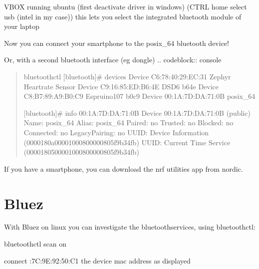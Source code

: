 \documentclass[letterpaper,10pt,english]{sphinxmanual}
\begin{document}
VBOX running ubuntu (first deactivate driver in windows)
(CTRL home \textendash{} select usb \textendash{} (intel in my case)) \textendash{} this lets you select the integrated bluetooth module of your laptop

\begin{sphinxVerbatim}[commandchars=\\\{\}]
  

     
 
\end{sphinxVerbatim}

Now you can connect your smartphone to the posix\_64 bluetooth device!

Or, with a second bluetooth interface (eg dongle)
.. code\sphinxhyphen{}block:: console
\begin{quote}

bluetoothctl
{[}bluetooth{]}\# devices
Device C6:78:40:29:EC:31 Zephyr Heartrate Sensor
Device C9:16:85:ED:B6:4E DS\sphinxhyphen{}D6 b64e
Device C8:B7:89:A9:B0:C9 Espruino\sphinxhyphen{}107 b0c9
Device 00:1A:7D:DA:71:0B posix\_64

{[}bluetooth{]}\# info 00:1A:7D:DA:71:0B
Device 00:1A:7D:DA:71:0B (public)
Name: posix\_64
Alias: posix\_64
Paired: no
Trusted: no
Blocked: no
Connected: no
LegacyPairing: no
UUID: Device Information        (0000180a\sphinxhyphen{}0000\sphinxhyphen{}1000\sphinxhyphen{}8000\sphinxhyphen{}00805f9b34fb)
UUID: Current Time Service      (00001805\sphinxhyphen{}0000\sphinxhyphen{}1000\sphinxhyphen{}8000\sphinxhyphen{}00805f9b34fb)
\end{quote}

If you have a smartphone, you can download the nrf utilities app from nordic.


\section{Bluez}
\label{\detokenize{bluetooth:bluez}}
With Bluez on linux you can investigate the bluetoothservices,  using bluetoothctl:

\begin{sphinxVerbatim}[commandchars=\\\{\}]
bluetoothctl
scan on


connect :7C:9E:92:50:C1 the device mac address as displayed

\end{sphinxVerbatim}
\end{document}

